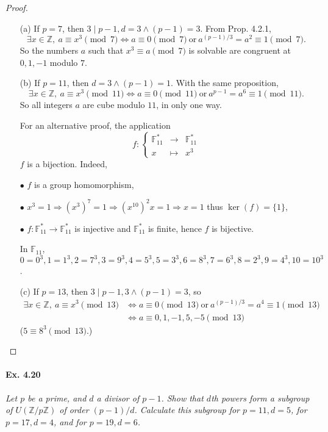 \documentclass[11pt,a4paper]{article}
\newcommand{\Z}{\mathbb{Z}}
\newcommand{\F}{\mathbb{F}}
\begin{document}
\begin{proof}
\begin{enumerate}
\item[(a)] If $p=7$, then $3 \mid p-1, d = 3\wedge (p-1) = 3$. From Prop. 4.2.1,
$$\exists x \in \Z, \ a \equiv x^3 \pmod 7 \iff a \equiv 0 \pmod 7 \ \mathrm{or}\ a^{(p-1)/3} = a^2 \equiv 1 \pmod  7.$$
So the numbers $a$ such that $x^3 \equiv a \pmod {7}$ is solvable are congruent at $0,1,-1$ modulo $7$.
\item[(b)]  If $p = 11$, then $d = 3 \wedge (p-1) = 1$. With the same proposition, 
$$\exists x \in \Z, \ a \equiv x^3 \pmod {11} \iff a \equiv 0 \pmod {11} \ \mathrm{or}\ a^{p-1} = a^6 \equiv 1 \pmod  {11}.$$
So all integers $a$ are cube modulo $11$, in only one way.

For an alternative proof, the application 
$$f : 
\left\{
\begin{array}{ccc}
  \F_{11}^*& \to   &\F_{11}^*  \\
  x & \mapsto   &   x^3
\end{array}
\right.
$$
$f$ is a bijection. Indeed,

$\bullet$ $f$ is a group homomorphism, 

$\bullet$ $x^3 = 1 \Rightarrow (x^3)^7 = 1 \Rightarrow (x^{10})^2 x = 1 \Rightarrow x=1$ thus $\ker(f) = \{1\}$, 

$\bullet$ $f:\F_{11}^*\to \F_{11}^*$ is injective and $\F_{11}^*$ is finite, hence $f$ is bijective.

In $\F_{11}$, $0=0^3,1=1^3,2=7^3,3=9^3,4=5^3,5=3^3,6=8^3,7=6^3,8=2^3,9=4^3,10 = 10^3$.
\item[(c)] If $p=13$, then $3 \mid p-1, 3 \wedge (p-1) = 3$, so
\begin{align*}
\exists x \in \Z, \ a \equiv x^3 \pmod {13} & \iff a \equiv 0 \pmod {13} \ \mathrm{or}\ a^{(p-1)/3} = a^4 \equiv 1 \pmod  {13}\\
&\iff a \equiv 0,1,-1,5,-5 \pmod {13}
\end{align*}
($5 \equiv 8^3 \pmod {13}$.)
\end{enumerate}
\end{proof}

\paragraph{Ex. 4.20}

{\it Let $p$ be a prime, and $d$ a divisor of $p - 1$. Show that $d$th powers form a subgroup of $U(\Z/p\Z)$ of order $(p-1)/d$. Calculate this subgroup for $p = 11, d = 5$, for $p = 17, d = 4$, and for $p = 19, d = 6$.
}
\end{document}

